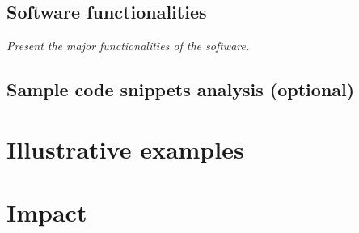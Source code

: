 \documentclass[preprint,12pt, a4paper]{elsarticle}
\begin{document}
\subsection{Software functionalities}
\textit{  Present the major functionalities of the software.}
  
 \subsection{Sample code snippets analysis (optional)}


\section{Illustrative examples}



\section{Impact}
\end{document}
